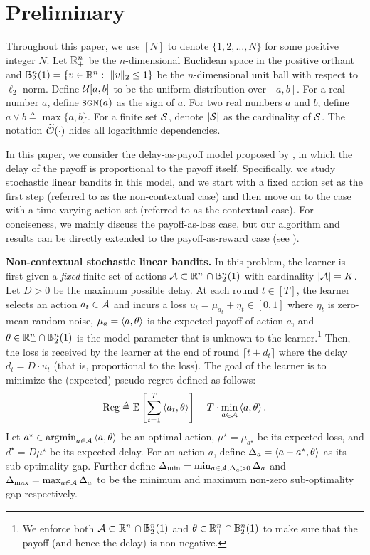 \section{Preliminary}\label{sec: pre}
Throughout this paper, we use $[N]$ to denote $\{1,2,\dots,N\}$ for some positive integer $N$. Let $\mathbb{R}^n_+$ be the $n$-dimensional Euclidean space in the positive orthant and $\mathbb{B}_2^n(1)=\{v \in \mathbb{R}^n:~\|v\|_2\leq 1\}$ be the $n$-dimensional unit ball with respect to $\ell_2$ norm. Define ${\mathcal{U}}[a,b]$ to be the uniform distribution over $[a,b]$. For a real number $a$, define $\mbox{\sc sgn}(a)$ as the sign of $a$. For two real numbers $a$ and $b$, define $a\vee b\triangleq \max\{a,b\}$. For a finite set ${\mathcal{S}}$, denote $|{\mathcal{S}}|$ as the cardinality of ${\mathcal{S}}$. The notation $\widetilde{\mathcal{O}}(\cdot)$ hides all logarithmic dependencies.

In this paper, we consider the delay-as-payoff model proposed by \citet{schlisselberg2024delay}, in which the delay of the payoff is proportional to the payoff itself. Specifically, we study stochastic linear bandits in this model, and we start with a fixed action set as the first step (referred to as the non-contextual case) and then move on to the case with a time-varying action set (referred to as the contextual case). For conciseness, we mainly discuss the payoff-as-loss case, but our algorithm and results can be directly extended to the payoff-as-reward case (see ).

\textbf{Non-contextual stochastic linear bandits.} In this problem, the learner is first given a \emph{fixed} finite set of actions ${\mathcal{A}}\subset \mathbb{R}_+^n\cap\mathbb{B}_2^n(1)$ with cardinality $|{\mathcal{A}}|=K$. Let $D>0$ be the maximum possible delay. At each round $t\in [T]$, the learner selects an action $a_t\in {\mathcal{A}}$ and incurs a loss $u_t=\mu_{a_t}+\eta_t\in [0,1]$ where $\eta_t$ is zero-mean random noise, $\mu_{a}=\left\langle {a,\theta} \right\rangle$ is the expected payoff of action $a$, and $\theta\in \mathbb{R}_+^n\cap\mathbb{B}_2^n(1)$ is the model parameter that is unknown to the learner.\footnote{We enforce both ${\mathcal{A}}\subset \mathbb{R}_+^n\cap\mathbb{B}_2^n(1)$ and $\theta\in \mathbb{R}_+^n\cap\mathbb{B}_2^n(1)$ to make sure that the payoff (and hence the delay) is non-negative.}  Then, the loss is received by the learner at the end of round $\lceil t+d_t \rceil$ where the delay $d_t=D\cdot u_t$ (that is, proportional to the loss).  
The goal of the learner is to minimize the (expected) pseudo regret defined as follows:
\begin{align}\label{eqn:reg_linear_reward}
    {\mathrm{Reg}} \triangleq \mathbb{E}\left[\sum_{t=1}^T\left\langle {a_t,\theta} \right\rangle\right] - T\cdot \min_{a\in {\mathcal{A}}}\left\langle {a,\theta} \right\rangle.
\end{align}
Let $a^\star \in \operatorname*{argmin}_{a\in {\mathcal{A}}}\left\langle {a,\theta} \right\rangle$ be an optimal action, $\mu^\star = \mu_{a^\star}$ be its expected loss,
and $d^\star = D\mu^\star$ be its expected delay.
For an action $a$, define $\Delta_a = \left\langle {a-a^\star,\theta} \right\rangle$ as its sub-optimality gap. Further define $\Delta_{\min} = \min_{a\in {\mathcal{A}}, \Delta_a>0}\Delta_a$ and $\Delta_{\max} = \max_{a\in {\mathcal{A}}}\Delta_a$ to be the minimum and maximum non-zero sub-optimality gap respectively. 

